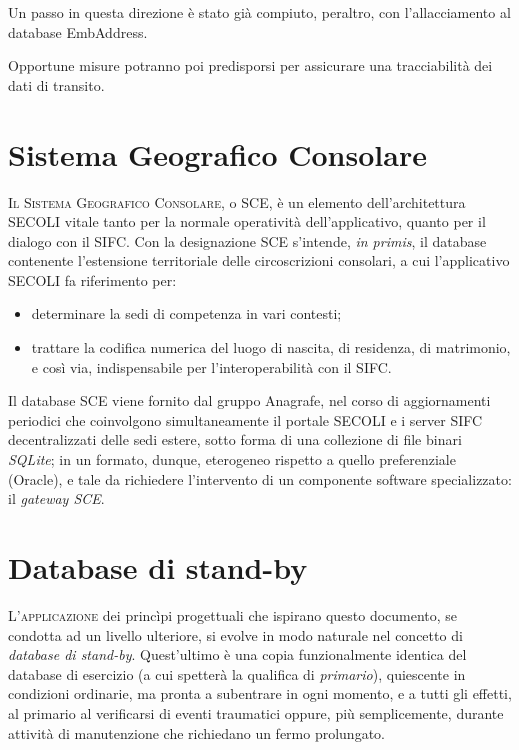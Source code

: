 \documentclass[headinclude,footinclude,a4paper,11pt,final]{scrreprt}
\begin{document}
Un passo in questa direzione è stato già compiuto, peraltro, con l'allacciamento al database EmbAddress.

Opportune misure potranno poi predisporsi per assicurare una tracciabilità dei dati di transito.

\section{Sistema Geografico Consolare}

\lettrine{I}{l Sistema Geografico Consolare}, o SCE, è un elemento dell'architettura SECOLI vitale tanto per la normale operatività dell'applicativo, quanto per il dialogo con il SIFC.  Con la designazione SCE s'intende, \emph{in primis}, il database contenente l'estensione territoriale delle circoscrizioni consolari, a cui l'applicativo SECOLI fa riferimento per:
\begin{itemize}
\item determinare la sedi di competenza in vari contesti;
\item trattare la codifica numerica del luogo di nascita, di residenza, di matrimonio, e così via, indispensabile per l'interoperabilità con il SIFC.
\end{itemize}

Il  database SCE viene fornito dal gruppo Anagrafe, nel corso di aggiornamenti periodici che coinvolgono simultaneamente il portale SECOLI e i server SIFC decentralizzati delle sedi estere, sotto forma di una collezione di file binari \emph{SQLite}; in un formato, dunque, eterogeneo rispetto a quello preferenziale (Oracle), e tale da richiedere l'intervento di un componente software specializzato: il \emph{gateway SCE}.

\section{Database di stand-by}

\lettrine{L'}{applicazione} dei princìpi progettuali che ispirano questo documento, se condotta ad un livello ulteriore, si evolve in modo naturale nel concetto di \emph{database di stand-by}.  Quest'ultimo è una copia funzionalmente identica del database di esercizio (a cui spetterà la qualifica di \emph{primario}), quiescente in condizioni ordinarie, ma pronta a subentrare in ogni momento, e a tutti gli effetti, al primario al verificarsi di eventi traumatici oppure, più semplicemente, durante attività di manutenzione che richiedano un fermo prolungato.
\end{document}
